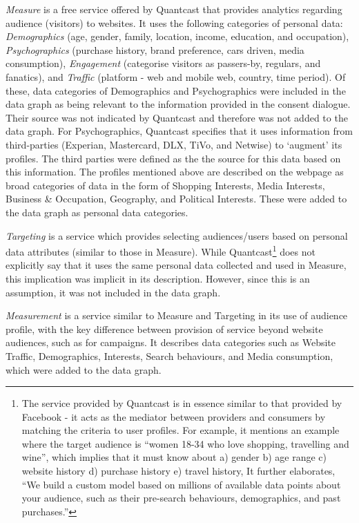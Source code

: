 \textit{Measure} is a free service offered by Quantcast that provides analytics regarding audience (visitors) to websites. It uses the following categories of personal data: \textit{Demographics} (age, gender, family, location, income, education, and occupation), \textit{Psychographics} (purchase history, brand preference, cars driven, media consumption), \textit{Engagement} (categorise visitors as passers-by, regulars, and fanatics), and \textit{Traffic} (platform - web and mobile web, country, time period). Of these, data categories of Demographics and Psychographics were included in the data graph as being relevant to the information provided in the consent dialogue. Their source was not indicated by Quantcast and therefore was not added to the data graph.
For Psychographics, Quantcast specifies that it uses information from third-parties (Experian, Mastercard, DLX, TiVo, and Netwise) to `augment' its profiles. The third parties were defined as the the source for this data based on this information.
The profiles mentioned above are described on the webpage as broad categories of data in the form of Shopping Interests, Media Interests, Business \& Occupation, Geography, and Political Interests. These were added to the data graph as personal data categories.

\textit{Targeting} is a service which provides selecting audiences/users based on personal data attributes (similar to those in Measure). While Quantcast\footnote{The service provided by Quantcast is in essence similar to that provided by Facebook - it acts as the mediator between providers and consumers by matching the criteria to user profiles. For example, it mentions an example where the target audience is ``women 18-34 who love shopping, travelling and wine'', which implies that it must know about a) gender b) age range c) website history d) purchase history e) travel history, It further elaborates, ``We build a custom model based on millions of available data points about your audience, such as their pre-search behaviours, demographics, and past purchases.''} does not explicitly say that it uses the same personal data collected and used in Measure, this implication was implicit in its description. However, since this is an assumption, it was not included in the data graph.

\textit{Measurement} is a service similar to Measure and Targeting in its use of audience profile, with the key difference between provision of service beyond website audiences, such as for campaigns. It describes data categories such as Website Traffic, Demographics, Interests, Search behaviours, and Media consumption, which were added to the data graph.

